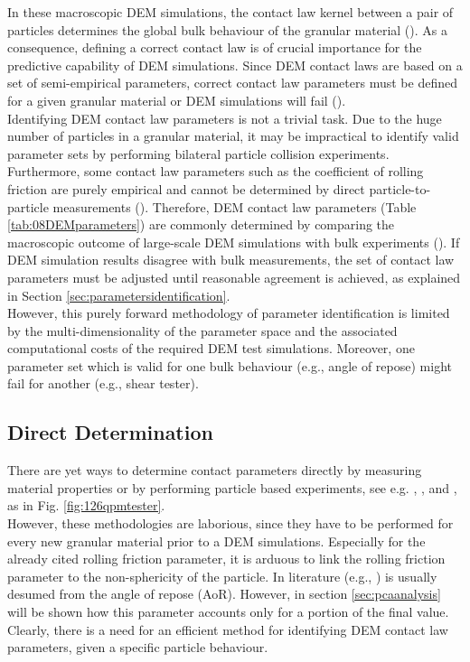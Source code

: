 In these macroscopic \acs{DEM} simulations, the contact law kernel between a 
pair of particles determines the global bulk behaviour of the granular material
(\citet{RefWorks:131}).
As a consequence, defining a correct contact law is of crucial importance for the predictive 
capability of \acs{DEM} simulations. 
Since \acs{DEM} contact laws are based 
on a set of semi-empirical parameters, correct contact law 
parameters must be defined for a given granular material
or \acs{DEM} simulations will fail (\citet{RefWorks:177}). \\
Identifying \acs{DEM} contact law parameters is not a trivial task. 
Due to the huge number of particles in a granular material, it
may be impractical to identify valid parameter sets by performing bilateral 
particle collision experiments. 
Furthermore, some contact law parameters such as the coefficient of rolling
friction are purely empirical and cannot be determined by direct 
particle-to-particle measurements (\citet{RefWorks:87}).
Therefore, \acs{DEM} contact law parameters (Table \ref{tab:08DEMparameters}) are
commonly determined by comparing the macroscopic outcome of large-scale \acs{DEM}
simulations with bulk experiments (\citet{RefWorks:91}). 
If \acs{DEM} simulation results disagree with bulk measurements, the set of contact
law parameters must be adjusted until reasonable agreement is achieved, as
explained in Section \ref{sec:parametersidentification}.\\
However, this purely forward methodology of parameter identification is limited by 
the multi-dimensionality of the parameter space and the associated computational costs of the required 
\acs{DEM} test simulations. 
Moreover, one parameter set which is valid for one bulk behaviour (e.g., angle
of repose) might fail for another (e.g., shear tester). \\

\subsection{Direct Determination}
\label{subsec:directdetermination}


There are yet ways to determine contact parameters directly by measuring
material properties or by performing particle based experiments, see e.g.
\citet{RefWorks:177}, \citet{RefWorks:181}, and \citet{RefWorks:186}, as in
Fig. \ref{fig:126qpmtester}.\\
However, these methodologies are laborious, 
since they have to be performed for every new granular material prior to a \acs{DEM}
simulations. 
Especially for the already cited rolling friction parameter, it is arduous to
link the rolling friction parameter to the non-sphericity of the particle.
In literature (e.g., \citet{RefWorks:177}) is usually desumed from the angle of
repose (\acs{AoR}).
However, in section \ref{sec:pcaanalysis} will be shown how this parameter
accounts only for a portion of the final value.\\
Clearly, there is a
need for an efficient method for identifying \acs{DEM} contact law parameters, given
a specific particle behaviour.



